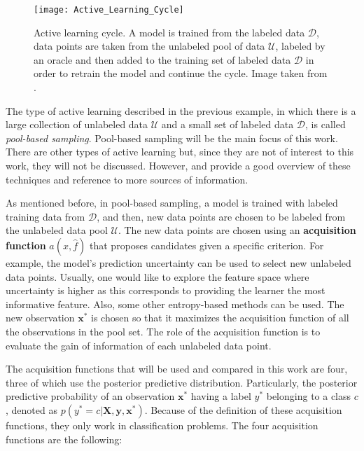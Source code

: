 \begin{figure}[H]
    \centering
    \texttt{[image: Active\_Learning\_Cycle]}
    \caption{Active learning cycle. A model is trained from the labeled data $\mathcal{D}$, data points are taken from the unlabeled pool of data $\mathcal{U}$, labeled by an oracle and then added to the training set of labeled data $\mathcal{D}$ in order to retrain the model and continue the cycle. Image taken from \cite{settles.tr09}.}
    \label{fig:Active_Learning_Cycle}
\end{figure}

The type of active learning described in the previous example, in which there is a large collection of unlabeled data $\mathcal{U}$ and a small set of labeled data $\mathcal{D}$, is called \textit{pool-based sampling}. Pool-based sampling will be the main focus of this work. There are other types of active learning but, since they are not of interest to this work, they will not be discussed. However, \cite{olsson2009literature} and \cite{settles.tr09} provide a good overview of these techniques and reference to more sources of information.

As mentioned before, in pool-based sampling, a model is trained with labeled training data from $\mathcal{D}$, and then, new data points are chosen to be labeled from the unlabeled data pool $\mathcal{U}$. The new data points are chosen using an \textbf{acquisition function} $a(x, \hat{f})$
that proposes candidates given a specific criterion. For example, the model's prediction uncertainty can be used to select new unlabeled data points. Usually, one would like to explore the feature space where uncertainty is higher as this corresponds to providing the learner the most informative feature. Also, some other entropy-based methods can be used. The new observation $\boldsymbol{x}^*$ is chosen so that it maximizes the acquisition function of all the observations in the pool set. The role of the acquisition function is to evaluate the gain of information of each unlabeled data point.

The acquisition functions that will be used and compared in this work are four, three of which use the posterior predictive distribution. Particularly, the posterior predictive probability of an observation $\boldsymbol{x}^*$ having a label $y^*$ belonging to a class $c$, denoted as $p(y^* = c | \boldsymbol{X}, \boldsymbol{y}, \boldsymbol{x}^*)$. Because of the definition of these acquisition functions, they only work in classification problems. The four acquisition functions are the following:

